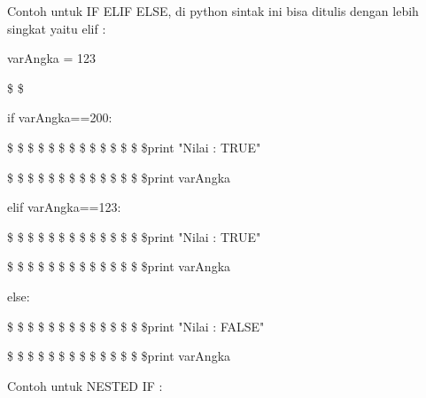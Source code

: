 Contoh untuk IF ELIF ELSE, di python sintak ini bisa ditulis dengan lebih singkat yaitu elif :  \par
\vspace{12pt}
\noindent 
varAngka = 123 \par
\noindent 
 \$  \$ \par
\noindent 
if varAngka==200: \par
\vspace{12pt}
\noindent 
 \$  \$  \$  \$  \$  \$  \$  \$  \$  \$  \$  \$  \$  \$print "Nilai : TRUE" \par
\vspace{12pt}
\noindent 
 \$  \$  \$  \$  \$  \$  \$  \$  \$  \$  \$  \$  \$  \$print varAngka \par
\vspace{12pt}
\noindent 
elif varAngka==123: \par
\vspace{12pt}
\noindent 
 \$  \$  \$  \$  \$  \$  \$  \$  \$  \$  \$  \$  \$  \$print "Nilai : TRUE" \par
\vspace{12pt}
\noindent 
 \$  \$  \$  \$  \$  \$  \$  \$  \$  \$  \$  \$  \$  \$print varAngka \par
\vspace{12pt}
\noindent 
else: \par
\vspace{12pt}
\noindent 
 \$  \$  \$  \$  \$  \$  \$  \$  \$  \$  \$  \$  \$  \$print "Nilai : FALSE" \par
\vspace{12pt}
\noindent 
 \$  \$  \$  \$  \$  \$  \$  \$  \$  \$  \$  \$  \$  \$print varAngka \par
\vspace{12pt}
\noindent 
Contoh untuk NESTED IF :  \par
\vspace{12pt}
